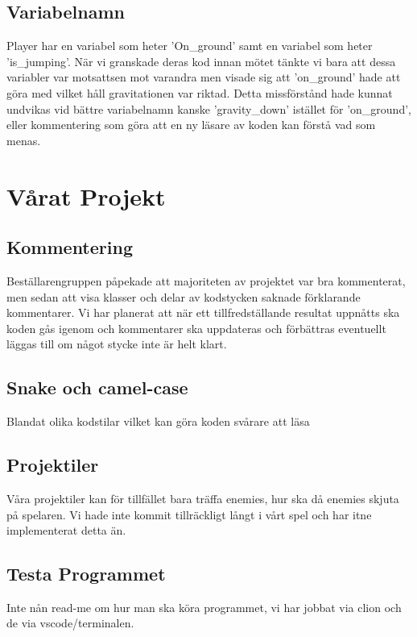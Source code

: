 \documentclass{TDP005mall}
\begin{document}
\subsection{Variabelnamn}
Player har en variabel som heter 'On\_ground' samt en variabel som heter 'is\_jumping'. När vi granskade deras kod innan mötet tänkte vi bara att dessa variabler var motsattsen mot varandra men visade sig att 'on\_ground' hade att göra med vilket håll gravitationen var riktad. Detta missförstånd hade kunnat undvikas vid bättre variabelnamn kanske 'gravity\_down' istället för 'on\_ground', eller kommentering som göra att en ny läsare av koden kan förstå vad som menas.

\section{Vårat Projekt}
\subsection{Kommentering}
Beställarengruppen påpekade att majoriteten av projektet var bra kommenterat, men sedan att visa klasser och delar av kodstycken saknade förklarande kommentarer.
Vi har planerat att när ett tillfredställande resultat uppnåtts ska koden gås igenom och kommentarer ska uppdateras och förbättras eventuellt läggas till om något stycke inte är helt klart.

\subsection{Snake och camel-case}
Blandat olika kodstilar vilket kan göra koden svårare att läsa

\subsection{Projektiler}
Våra projektiler kan för tillfället bara träffa enemies, hur ska då enemies skjuta på spelaren. Vi hade inte kommit tillräckligt långt i vårt spel och har itne implementerat detta än.

\subsection{Testa Programmet}
Inte nån read-me om hur man ska köra programmet, vi har jobbat via clion och de via vscode/terminalen.
\end{document}

